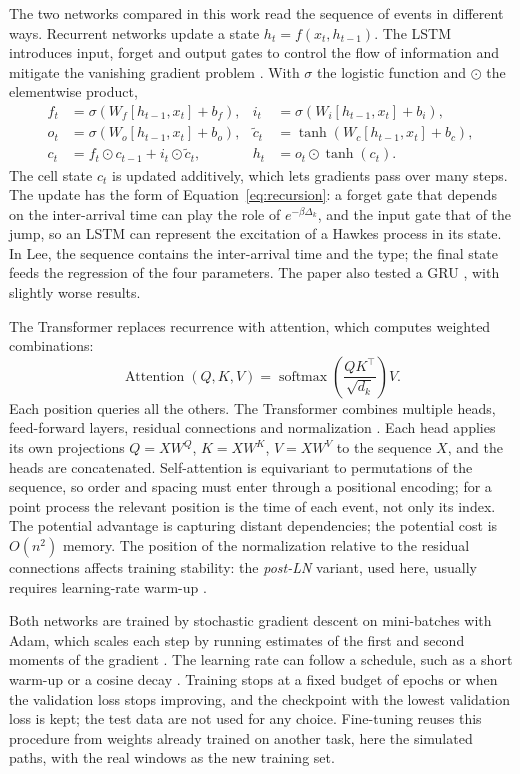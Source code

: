 The two networks compared in this work read the sequence of events in different ways.
Recurrent networks update a state \(h_t=f(x_t,h_{t-1})\). The LSTM introduces input,
forget and output gates to control the flow of information and mitigate the
vanishing gradient problem \citep{hochreiter1997}. With \(\sigma\) the logistic function
and \(\odot\) the elementwise product,
\begin{align*}
 f_t&=\sigma(W_f[h_{t-1},x_t]+b_f), & i_t&=\sigma(W_i[h_{t-1},x_t]+b_i),\\
 o_t&=\sigma(W_o[h_{t-1},x_t]+b_o), & \tilde c_t&=\tanh(W_c[h_{t-1},x_t]+b_c),\\
 c_t&=f_t\odot c_{t-1}+i_t\odot\tilde c_t, & h_t&=o_t\odot\tanh(c_t).
\end{align*}
The cell state \(c_t\) is updated additively, which lets gradients pass over many steps.
The update has the form of Equation~\eqref{eq:recursion}: a forget gate that depends on the
inter-arrival time can play the role of \(e^{-\beta\Delta_k}\), and the input gate that of
the jump, so an LSTM can represent the excitation of a Hawkes process in its state. In
Lee, the sequence contains the inter-arrival time and the type; the final state feeds the
regression of the four parameters. The paper also tested a GRU \citep{cho2014}, with
slightly worse results.

The Transformer replaces recurrence with attention, which computes weighted combinations:
\[
 \operatorname{Attention}(Q,K,V)=
 \operatorname{softmax}\left(\frac{QK^\top}{\sqrt{d_k}}\right)V.
\]
Each position queries all the others. The Transformer combines multiple heads,
feed-forward layers, residual connections and normalization \citep{vaswani2017}. Each head
applies its own projections \(Q=XW^Q\), \(K=XW^K\), \(V=XW^V\) to the sequence \(X\), and
the heads are concatenated. Self-attention is equivariant to permutations of the sequence,
so order and spacing must enter through a positional encoding; for a point process the
relevant position is the time of each event, not only its index. The
potential advantage is capturing distant dependencies; the potential cost is
\(O(n^2)\) memory. The position of the normalization relative to the residual
connections affects training stability: the \emph{post-LN} variant, used here,
usually requires learning-rate warm-up \citep{xiong2020}.

Both networks are trained by stochastic gradient descent on mini-batches with Adam, which
scales each step by running estimates of the first and second moments of the gradient
\citep{kingma2015}. The learning rate can follow a schedule, such as a short warm-up or a cosine decay
\citep{xiong2020,loshchilov2017}. Training stops at a fixed budget of epochs or when the
validation loss stops improving, and the checkpoint with the lowest validation loss is kept;
the test data are not used for any choice. Fine-tuning reuses this procedure from weights
already trained on another task, here the simulated paths, with the real windows as the new
training set.
